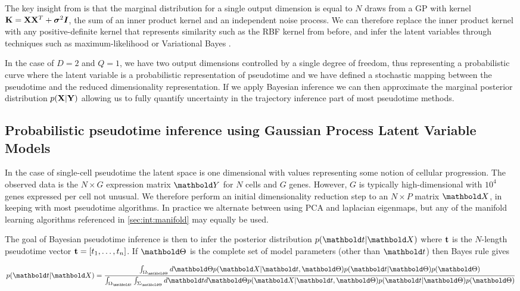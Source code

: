 The key insight from \cite{lawrence2005probabilistic} is that the marginal distribution for a single output dimension is equal to $N$ draws from a GP with kernel ${\bf K} = {\bf X} {\bf X}^T + {\bm \sigma}^2 {\bm I}$, the sum of an inner product kernel and an independent noise process. We can therefore replace the inner product kernel with any positive-definite kernel that represents similarity such as the RBF kernel from before, and infer the latent variables through techniques such as maximum-likelihood \cite{lawrence2005probabilistic} or Variational Bayes \cite{titsias2009variational}.

In the case of $D = 2$ and $Q = 1$, we have two output dimensions controlled by a single degree of freedom, thus representing a probabilistic curve where the latent variable is a probabilistic representation of pseudotime and we have defined a stochastic mapping between the pseudotime and the reduced dimensionality representation. If we apply Bayesian inference we can then approximate the marginal posterior distribution $p({\bf X} | {\bf Y})$ allowing us to fully quantify uncertainty in the trajectory inference part of most pseudotime methods.


\subsection{Probabilistic pseudotime inference using Gaussian Process Latent Variable Models}

In the case of single-cell pseudotime the latent space is one dimensional with values representing some notion of cellular progression. The observed data is the $N \times G$ expression matrix $\mbY$ for $N$ cells and $G$ genes. However, $G$ is typically high-dimensional with $10^4$ genes expressed per cell not unusual. We therefore perform an initial dimensionality reduction step to an $N \times P$ matrix $\mbX$, in keeping with most pseudotime algorithms. In practice we alternate between using PCA and laplacian eigenmaps, but any of the manifold learning algorithms referenced in \ref{sec:int:manifold} may equally be used.

The goal of Bayesian pseudotime inference is then to infer the posterior distribution $p(\mbt|\mbX)$ where ${\bf t}$ is the $N$-length pseudotime vector ${\bf t} = [ t_1, \dots, t_n ]$. If $\mbTheta$ is  the complete set of model parameters (other than $\mbt$) then Bayes rule gives

\begin{equation}
	p(\mbt | \mbX) = \frac{
\int_{\Omega_{\mbTheta}} d\mbTheta p(\mbX | \mbt, \mbTheta) p(\mbt | \mbTheta) p(\mbTheta)
	}{
\int_{\Omega_{\mbt}} \int_{\Sigma_{\mbTheta}} d\mbt d\mbTheta p(\mbX | \mbt, \mbTheta) p(\mbt | \mbTheta) p(\mbTheta)
	}
\end{equation} \label{eq:bayesrule}


